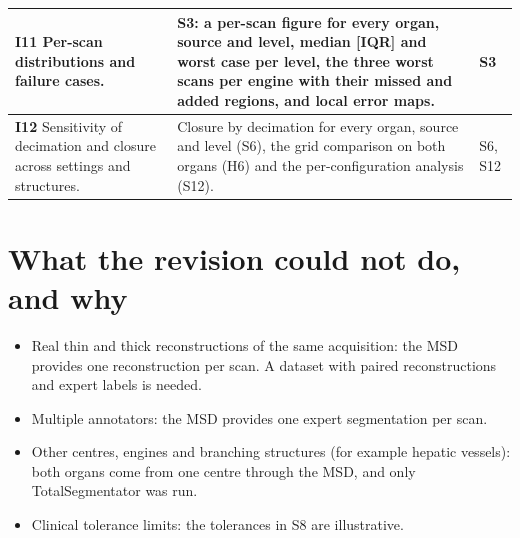 \documentclass[11pt]{article}
\begin{document}
\begin{longtable}{@{}>{\raggedright\arraybackslash}p{}>{\raggedright\arraybackslash}p{}>{\raggedright\arraybackslash}p{}@{}}
\textbf{I11} Per-scan distributions and failure cases. & S3: a per-scan figure for every organ, source and level, median [IQR] and worst case per level, the three worst scans per engine with their missed and added regions, and local error maps. & S3 \\ \midrule
\textbf{I12} Sensitivity of decimation and closure across settings and structures. & Closure by decimation for every organ, source and level (S6), the grid comparison on both organs (H6) and the per-configuration analysis (S12). & S6, S12 \\ \bottomrule
\end{longtable}
\section*{What the revision could not do, and why}
\begin{itemize}
\item Real thin and thick reconstructions of the same acquisition: the MSD provides one reconstruction per scan. A dataset with paired reconstructions and expert labels is needed.
\item Multiple annotators: the MSD provides one expert segmentation per scan.
\item Other centres, engines and branching structures (for example hepatic vessels): both organs come from one centre through the MSD, and only TotalSegmentator was run.
\item Clinical tolerance limits: the tolerances in S8 are illustrative.
\end{itemize}
\end{document}
